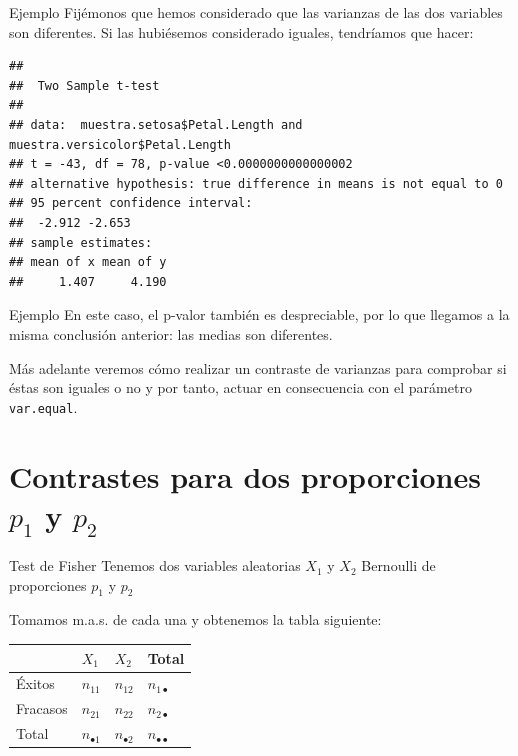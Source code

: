 \documentclass[
  ignorenonframetext,
]{beamer}
\newenvironment{Shaded}{\begin{snugshade}}{\end{snugshade}}
\newcommand{\DataTypeTok}[1]{\textcolor[rgb]{0.13,0.29,0.53}{#1}}
\newcommand{\KeywordTok}[1]{\textcolor[rgb]{0.13,0.29,0.53}{\textbf{#1}}}
\newcommand{\NormalTok}[1]{#1}
\newcommand{\OperatorTok}[1]{\textcolor[rgb]{0.81,0.36,0.00}{\textbf{#1}}}
\newcommand{\OtherTok}[1]{\textcolor[rgb]{0.56,0.35,0.01}{#1}}
\newcommand{\StringTok}[1]{\textcolor[rgb]{0.31,0.60,0.02}{#1}}
\begin{document}
\begin{frame}[fragile]{Ejemplo}
\protect\hypertarget{ejemplo-34}{}
Fijémonos que hemos considerado que las varianzas de las dos variables
son diferentes. Si las hubiésemos considerado iguales, tendríamos que
hacer:

\begin{Shaded}
\end{Shaded}

\begin{verbatim}
## 
##  Two Sample t-test
## 
## data:  muestra.setosa$Petal.Length and muestra.versicolor$Petal.Length
## t = -43, df = 78, p-value <0.0000000000000002
## alternative hypothesis: true difference in means is not equal to 0
## 95 percent confidence interval:
##  -2.912 -2.653
## sample estimates:
## mean of x mean of y 
##     1.407     4.190
\end{verbatim}
\end{frame}

\begin{frame}[fragile]{Ejemplo}
\protect\hypertarget{ejemplo-35}{}
En este caso, el p-valor también es despreciable, por lo que llegamos a
la misma conclusión anterior: las medias son diferentes.

Más adelante veremos cómo realizar un contraste de varianzas para
comprobar si éstas son iguales o no y por tanto, actuar en consecuencia
con el parámetro \texttt{var.equal}.
\end{frame}

\hypertarget{contrastes-para-dos-proporciones-p_1-y-p_2}{%
\section{\texorpdfstring{Contrastes para dos proporciones \(p_1\) y
\(p_2\)}{Contrastes para dos proporciones p\_1 y p\_2}}\label{contrastes-para-dos-proporciones-p_1-y-p_2}}

\begin{frame}{Test de Fisher}
\protect\hypertarget{test-de-fisher}{}
Tenemos dos variables aleatorias \(X_1\) y \(X_2\) Bernoulli de
proporciones \(p_1\) y \(p_2\)

Tomamos m.a.s. de cada una y obtenemos la tabla siguiente:

\begin{longtable}[]{@{}llll@{}}
\toprule
& \(X_1\) & \(X_2\) & Total\tabularnewline
\midrule
\endhead
Éxitos & \(n_{11}\) & \(n_{12}\) & \(n_{1\bullet}\)\tabularnewline
Fracasos & \(n_{21}\) & \(n_{22}\) & \(n_{2\bullet}\)\tabularnewline
Total & \(n_{\bullet 1}\) & \(n_{\bullet 2}\) &
\(n_{\bullet\bullet}\)\tabularnewline
\bottomrule
\end{longtable}
\end{frame}
\end{document}
